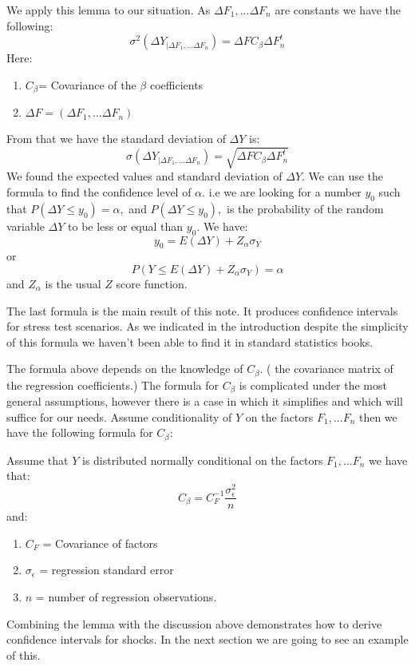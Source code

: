 \documentclass[a4paper]{amsart}
\begin{document}
We apply this lemma to our situation. As $\Delta F_1,...\Delta F_n$ are constants we have the following: 
\begin{equation}
\sigma^2\left(\Delta Y_{|\Delta F_1,...\Delta F_n}\right)=\Delta FC_\beta\Delta F_n^t
\end{equation}
Here:
\begin{enumerate}
\item $C_\beta$= Covariance of the $\beta$ coefficients 
\item $\Delta F = \left(\Delta F_1,...\Delta F_n\right)$
\end{enumerate}
From that we have the standard deviation of $\Delta Y$ is: 
\begin{equation}\label{sdf}
\sigma\left(\Delta Y_{|\Delta F_1,...\Delta F_n}\right)=\sqrt{\Delta FC_\beta\Delta F_n^t}
\end{equation}
We found the expected values and standard deviation of $\Delta Y .$ We can use the formula to find the confidence level of  $\alpha.$ i.e we are looking for a number $y_0$ such that $P\left(\Delta Y\leq y_0\right)=\alpha,$ and $P(\Delta Y\leq y_0),$ is the probability of the random variable $\Delta Y$ to be less or equal than $y_0$. We have: 
\begin{equation}
y_0=E(\Delta Y) + Z_{\alpha}\sigma_Y
\end{equation}
or 
\begin{equation}
P(Y\leq E(\Delta Y) + Z_{\alpha}\sigma_Y)=\alpha
\end{equation}
and $Z_\alpha$ is the usual $Z$ score function.

The last formula is the main result of this note. It produces confidence intervals for stress test scenarios. As we indicated in the introduction despite the simplicity of this formula we haven't been able to find it in standard statistics books. 

The formula above depends on the knowledge of $C_\beta.$ ( the covariance matrix of the regression coefficients.) The formula for $C_{\beta}$ is complicated under the most general assumptions, however there is a case in which it simplifies and which will suffice for our needs. Assume conditionality of $Y$ on the factors $F_1,...F_n$ then we have the following formula for $C_\beta:$
\begin{lem}\label{lemmac}
Assume that $Y$ is distributed normally conditional on the factors $F_1,...F_n$ we have that: 
\begin{equation}
C_{\beta}=C_F^{-1}\frac{\sigma_{\epsilon}^2}{n}
\end{equation}
and: 
\begin{enumerate}
\item $C_F$ = Covariance of factors
\item $\sigma_{\epsilon}$ = regression standard error
\item $n$ = number of regression observations.
\end{enumerate}
\end{lem}
Combining the lemma with the discussion above demonstrates how to derive confidence intervals for shocks. In the next section we are going to see an example of this.
\end{document}
